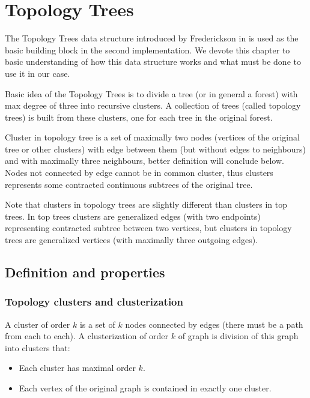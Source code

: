 \chapter{Topology Trees}

The Topology Trees data structure introduced by Frederickson in
\cite{DSforDynamicallyMaintainingRootedTrees} is used as the basic building
block in the second implementation. We devote this chapter to basic
understanding of how this data structure works and what must be done to use
it in our case.

Basic idea of the Topology Trees is to divide a tree (or in general a forest)
with max degree of three into recursive {\I clusters}. A collection of trees
(called {\I topology trees}) is built from these clusters, one for each tree in
the original forest.

Cluster in topology tree is a set of maximally two nodes (vertices of the
original tree or other clusters) with edge between them (but without edges to
neighbours) and with maximally three neighbours, better definition will conclude
below. Nodes not connected by edge cannot be in common cluster, thus clusters
represents some contracted continuous subtrees of the original tree.

Note that clusters in topology trees are slightly different than clusters in
top trees. In top trees clusters are generalized edges (with two endpoints)
representing contracted subtree between two vertices, but clusters in topology
trees are generalized vertices (with maximally three outgoing edges).

\section{Definition and properties}

\subsection{Topology clusters and clusterization}

A {\I cluster of order $k$} is a set of $k$ nodes connected by edges (there must
be a path from each to each). A {\I clusterization of order $k$} of graph is
division of this graph into clusters that:
\begin{itemize}
\item Each cluster has maximal order $k$.
\item Each vertex of the original graph is contained in exactly one cluster.
\end{itemize}

